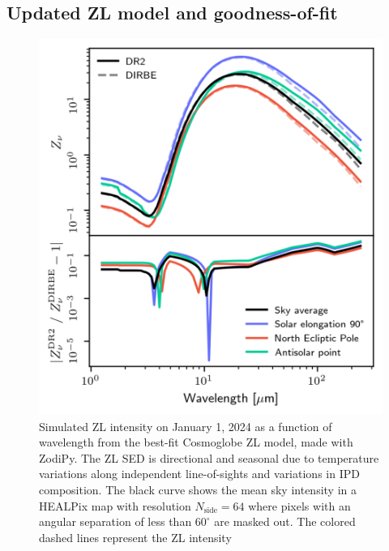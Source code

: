 \documentclass[twocolumn]{aa}
\begin{document}
\subsection{Updated ZL model and goodness-of-fit}

\begin{figure}
    \centering
    \includegraphics[width=\columnwidth]{figs/zodi_comp.pdf}
    \caption{Simulated ZL intensity on January 1, 2024 as a function of wavelength from the best-fit 
    Cosmoglobe ZL model, made with ZodiPy. The ZL SED is directional 
    and seasonal due to temperature variations along independent line-of-sights and variations in IPD composition. 
    The black curve shows the mean sky intensity in a HEALPix map with resolution
    $N_\mathrm{side}= 64$ where pixels with an angular separation of less than
    $60^\circ$ are masked out. The colored dashed lines represent the ZL 
    intensity
    }
    \label{fig:zodi-intensity}
\end{figure}
\end{document}
